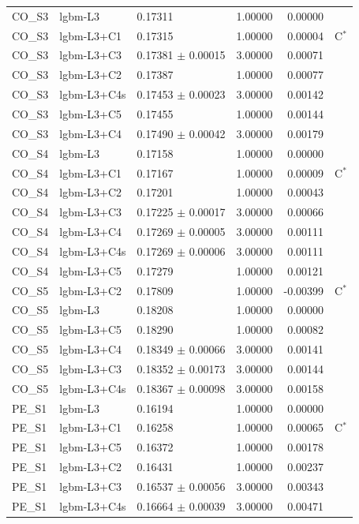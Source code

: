 \begin{tabular}{lllrrl}
CO\_S3 & lgbm-L3 & 0.17311 & 1.00000 & 0.00000 &  \\
CO\_S3 & lgbm-L3+C1 & 0.17315 & 1.00000 & 0.00004 & C$^{*}$ \\
CO\_S3 & lgbm-L3+C3 & 0.17381 $\pm$ 0.00015 & 3.00000 & 0.00071 &  \\
CO\_S3 & lgbm-L3+C2 & 0.17387 & 1.00000 & 0.00077 &  \\
CO\_S3 & lgbm-L3+C4s & 0.17453 $\pm$ 0.00023 & 3.00000 & 0.00142 &  \\
CO\_S3 & lgbm-L3+C5 & 0.17455 & 1.00000 & 0.00144 &  \\
CO\_S3 & lgbm-L3+C4 & 0.17490 $\pm$ 0.00042 & 3.00000 & 0.00179 &  \\
CO\_S4 & lgbm-L3 & 0.17158 & 1.00000 & 0.00000 &  \\
CO\_S4 & lgbm-L3+C1 & 0.17167 & 1.00000 & 0.00009 & C$^{*}$ \\
CO\_S4 & lgbm-L3+C2 & 0.17201 & 1.00000 & 0.00043 &  \\
CO\_S4 & lgbm-L3+C3 & 0.17225 $\pm$ 0.00017 & 3.00000 & 0.00066 &  \\
CO\_S4 & lgbm-L3+C4 & 0.17269 $\pm$ 0.00005 & 3.00000 & 0.00111 &  \\
CO\_S4 & lgbm-L3+C4s & 0.17269 $\pm$ 0.00006 & 3.00000 & 0.00111 &  \\
CO\_S4 & lgbm-L3+C5 & 0.17279 & 1.00000 & 0.00121 &  \\
CO\_S5 & lgbm-L3+C2 & 0.17809 & 1.00000 & -0.00399 & C$^{*}$ \\
CO\_S5 & lgbm-L3 & 0.18208 & 1.00000 & 0.00000 &  \\
CO\_S5 & lgbm-L3+C5 & 0.18290 & 1.00000 & 0.00082 &  \\
CO\_S5 & lgbm-L3+C4 & 0.18349 $\pm$ 0.00066 & 3.00000 & 0.00141 &  \\
CO\_S5 & lgbm-L3+C3 & 0.18352 $\pm$ 0.00173 & 3.00000 & 0.00144 &  \\
CO\_S5 & lgbm-L3+C4s & 0.18367 $\pm$ 0.00098 & 3.00000 & 0.00158 &  \\
PE\_S1 & lgbm-L3 & 0.16194 & 1.00000 & 0.00000 &  \\
PE\_S1 & lgbm-L3+C1 & 0.16258 & 1.00000 & 0.00065 & C$^{*}$ \\
PE\_S1 & lgbm-L3+C5 & 0.16372 & 1.00000 & 0.00178 &  \\
PE\_S1 & lgbm-L3+C2 & 0.16431 & 1.00000 & 0.00237 &  \\
PE\_S1 & lgbm-L3+C3 & 0.16537 $\pm$ 0.00056 & 3.00000 & 0.00343 &  \\
PE\_S1 & lgbm-L3+C4s & 0.16664 $\pm$ 0.00039 & 3.00000 & 0.00471 &  \\

\end{tabular}
